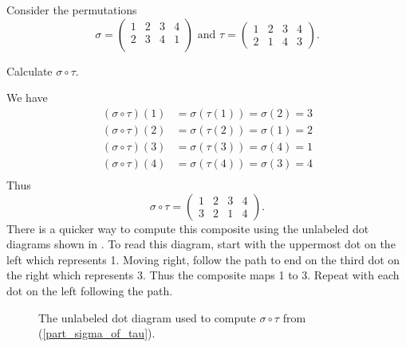 \begin{exam}
\label{exam_composing_perms}
    Consider the permutations   
        $$\sigma = \left ( \begin{array} {cccc} 1 & 2 & 3 & 4 \\ 2 & 3 & 4 & 1 \\ \end{array} \right ) \text{ and }
        \tau= \left ( \begin{array} {cccc} 1 & 2 & 3 & 4\\ 2 & 1 & 4 & 3 \end{array} \right ).$$
            \begin{apart}
                \item \label{part_sigma_of_tau} Calculate $\sigma \circ \tau$.
                    \begin{soln}
                        We have
                            \begin{align*}
                                (\sigma \circ \tau)(1) &= \sigma(\tau(1))=\sigma(2)=3  \\
                                (\sigma \circ \tau)(2) &= \sigma(\tau(2))=\sigma(1)=2 \\
                                (\sigma \circ \tau)(3) &= \sigma(\tau(3))=\sigma(4)=1 \\
                                (\sigma \circ \tau)(4) &= \sigma(\tau(4))=\sigma(3)=4 \\
                            \end{align*}
                        Thus $$\sigma \circ \tau = \left ( \begin{array} {cccc} 1 & 2 & 3 & 4 \\ 3 & 2 & 1 & 4 \end{array} \right ).$$
                        There is a quicker way to compute this composite using the unlabeled dot diagrams shown in .  To read this diagram, start with the uppermost dot on the left which represents 1.  Moving right, follow the path to end on the third dot on the right which represents 3.  Thus the composite maps 1 to 3.  Repeat with each dot on the left following the path.
                    \begin{figure}[hbtp]
                        \centering
                        
                        \caption{The unlabeled dot diagram used to compute $\sigma \circ \tau$ from  (\ref{part_sigma_of_tau}).}
                        \label{fig_sigma_of_tau}

\end{figure}
\end{soln}
\end{apart}
\end{exam}

